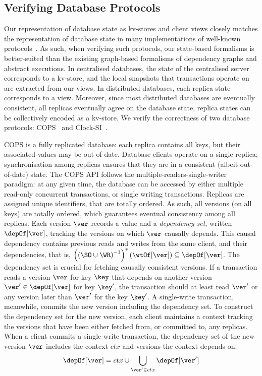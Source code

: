 \subsection{Verifying Database Protocols}
\label{sec:verify-impl}
Our representation of database state as kv-stores and client views closely matches the representation of database state in many implementations of 
well-known protocols~\cite{ramp,rola,cops,wren,redblue,PSI,NMSI,gdur,clocksi,distrsi}.
As such, when verifying such protocols, our state-based formalisms is better-suited than the existing graph-based formalisms of dependency graphs and abstract executions. 
In centralised databases, the state of the centralised server corresponds to a kv-store,
and the local snapshots that transactions operate on are extracted from our views.  
In distributed databases, each replica state corresponds to a view. 
Moreover, since most distributed databases are eventually consistent, 
\ie all replicas eventually agree on the database state,
replica states can be collectively encoded as a kv-store.
We verify the correctness of two database protocols:
COPS~\cite{cops} and Clock-SI~\cite{clocksi}.

COPS is a fully replicated database: each replica contains all keys, but their associated values may be out of date.
Database clients operate on a single replica; 
synchronisation among replicas ensures that they are in a consistent (albeit out-of-date) state.
The COPS API follows the multiple-readers-single-writer paradigm: 
at any given time, the database can be accessed by either multiple read-only concurrent transactions, or single writing transactions. 
Replicas are assigned unique identifiers, that are totally ordered.
As such, all versions (on all keys) are totally ordered,
which guarantees eventual consistency among all replicas.
Each version $\ver$ records a value and a \emph{dependency set}, written $\depOf[\ver]$,
tracking the versions on which $\ver$ causally depends.
This causal dependency contains previous reads and writes from the same client, and their dependencies,
that is, 
\( \left( \left( \SO \cup \WR \right) ^{-1}\right)^{*}(\wtOf[\ver]) \subseteq \depOf[\ver] \).
The dependency set is crucial for fetching causally consistent versions.
If a transaction reads a version \( \ver \) for key \( \key \) that 
depends on another version \( \ver' \in \depOf[\ver]\) for key \( \key' \), 
the transaction should at least read \( \ver' \) or any version later than \( \ver' \) for the key \( \key' \).
A single-write transaction, meanwhile, commits the new version including the dependency set.
To construct the dependency set for the new version,
each client maintains a context tracking the versions that have been either fetched from, or committed to, any replicas.
When a client commits a single-write transaction,
the dependency set of the new version \( \ver \) includes the context \( ctx \) and versions the context depends on:
\[
    \depOf[\ver]  = ctx \cup \bigcup_{\ver' \in ctx} \depOf[\ver']
\]

